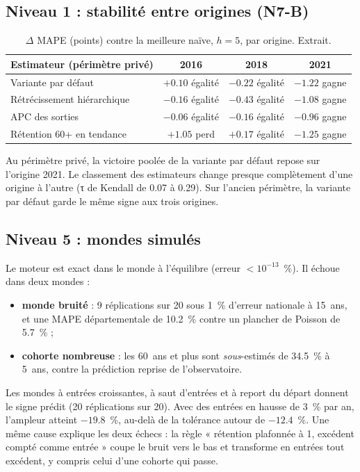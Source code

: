 \documentclass[11pt]{article}
\begin{document}
\subsection{Niveau 1 : stabilité entre origines (N7-B)}
\begin{table}[h]
\centering\small
\begin{tabular}{@{}lccc@{}}
\toprule
Estimateur (périmètre privé) & 2016 & 2018 & 2021 \\
\midrule
Variante par défaut & $+\num{0.10}$ égalité & $\num{-0.22}$ égalité & $\num{-1.22}$ gagne \\
Rétrécissement hiérarchique & $\num{-0.16}$ égalité & $\num{-0.43}$ égalité & $\num{-1.08}$ gagne \\
APC des sorties & $\num{-0.06}$ égalité & $\num{-0.16}$ égalité & $\num{-0.96}$ gagne \\
Rétention 60+ en tendance & $+\num{1.05}$ perd & $+\num{0.17}$ égalité & $\num{-1.25}$ gagne \\
\bottomrule
\end{tabular}
\caption{$\Delta$ MAPE (points) contre la meilleure naïve, $h = 5$, par origine\mesure{}. Extrait.}
\end{table}
Au périmètre privé, la victoire poolée de la variante par défaut repose sur l'origine 2021. Le
classement des estimateurs change presque complètement d'une origine à l'autre (τ de Kendall de
\num{0.07} à \num{0.29}\mesure{}). Sur l'ancien périmètre, la variante par défaut garde le même signe
aux trois origines.

\subsection{Niveau 5 : mondes simulés}
Le moteur est exact dans le monde à l'équilibre (erreur $< 10^{-13}$\mesure{}~\%). Il échoue dans deux
mondes :
\begin{itemize}
  \item \textbf{monde bruité} : 9 réplications sur 20 sous 1~\% d'erreur nationale à 15~ans, et une
        MAPE départementale de \num{10.2}\mesure{}~\% contre un plancher de Poisson de
        \num{5.7}\derive{}~\% ;
  \item \textbf{cohorte nombreuse} : les 60~ans et plus sont \emph{sous}-estimés de
        \num{34.5}\mesure{}~\% à 5~ans, contre la prédiction reprise de l'observatoire.
\end{itemize}
Les mondes à entrées croissantes, à saut d'entrées et à report du départ donnent le signe prédit
(20 réplications sur 20). Avec des entrées en hausse de 3~\% par an, l'ampleur atteint
$\num{-19.8}$\mesure{}~\%, au-delà de la tolérance autour de $-\num{12.4}$~\%. Une même cause explique
les deux échecs : la règle « rétention plafonnée à 1, excédent compté comme entrée » coupe le bruit
vers le bas et transforme en entrées tout excédent, y compris celui d'une cohorte qui passe.
\end{document}
